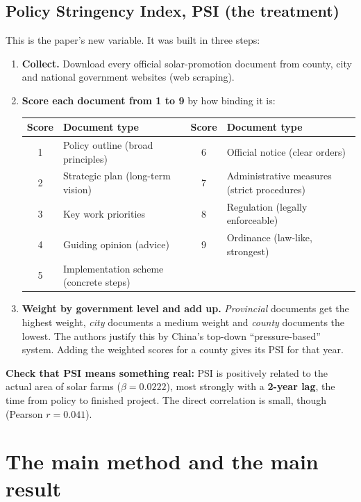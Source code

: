 \documentclass[11pt]{article}
\begin{document}
\subsection{Policy Stringency Index, PSI (the treatment)}
This is the paper's new variable. It was built in three steps:
\begin{enumerate}
\item \textbf{Collect.} Download every official solar-promotion document from county, city and national government websites (web scraping).
\item \textbf{Score each document from 1 to 9} by how binding it is:
\begin{table}[H]\centering\small
\begin{tabular}{clcl}
\toprule
Score & Document type & Score & Document type\\
\midrule
1 & Policy outline (broad principles) & 6 & Official notice (clear orders)\\
2 & Strategic plan (long-term vision) & 7 & Administrative measures (strict procedures)\\
3 & Key work priorities & 8 & Regulation (legally enforceable)\\
4 & Guiding opinion (advice) & 9 & Ordinance (law-like, strongest)\\
5 & Implementation scheme (concrete steps) & & \\
\bottomrule
\end{tabular}
\end{table}
\item \textbf{Weight by government level and add up.} \emph{Provincial} documents get the highest weight, \emph{city} documents a medium weight and \emph{county} documents the lowest. The authors justify this by China's top-down ``pressure-based'' system. Adding the weighted scores for a county gives its PSI for that year.
\end{enumerate}
\textbf{Check that PSI means something real:} PSI is positively related to the actual area of solar farms ($\beta=0.0222$), most strongly with a \textbf{2-year lag}, the time from policy to finished project. The direct correlation is small, though (Pearson $r=0.041$).

\section{The main method and the main result}
\end{document}
